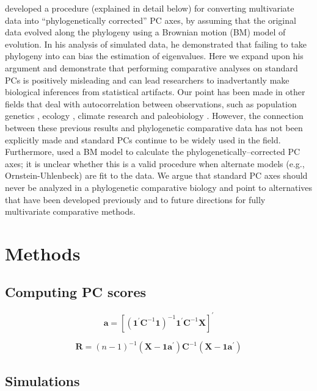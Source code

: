 \documentclass[a4paper,12pt]{article}
\begin{document}
\citet{Revell2008} developed a procedure (explained in detail below) for converting multivariate data into ``phylogenetically corrected'' PC axes, by assuming that the original data evolved along the phylogeny using a Brownian motion (BM) model of evolution. In his analysis of simulated data, he demonstrated that failing to take phylogeny into can bias the estimation of eigenvalues. Here we expand upon his argument and demonstrate that performing comparative analyses on standard PCs is positively misleading and can lead researchers to inadvertantly make biological inferences from statistical artifacts. Our point has been made in other fields that deal with autocorrelation between observations, such as population genetics \citep{Novembre}, ecology \citep{Podani2002}, climate research \citep{Richman1986} and paleobiology \citep{Bookstein2012}. However, the connection between these previous results and phylogenetic comparative data has not been explicitly made and standard PCs continue to be widely used in the field. Furthermore, \citet{Revell2008} used a BM model to calculate the phylogenetically--corrected PC axes; it is unclear whether this is a valid procedure when alternate models (e.g., Ornstein-Uhlenbeck) are fit to the data. We argue that standard PC axes should never be analyzed in a phylogenetic comparative biology and point to alternatives that have been developed previously and to future directions for fully multivariate comparative methods.

\section{Methods}
\subsection{Computing PC scores}

\begin{equation}
\mathbf{a}=[(\mathbf{1}^\prime \mathbf{C}^{-1} \mathbf{1})^{-1} 
\mathbf{1}^\prime \mathbf{C}^{-1} \mathbf{X}]^\prime
\end{equation}

\begin{equation}
\mathbf{R} = (n-1)^{-1} (\mathbf{X} - \mathbf{1a}^\prime ) \mathbf{C}^{-1} 
(\mathbf{X} - \mathbf{1a}^\prime )
\end{equation}

\subsection{Simulations}
\end{document}
